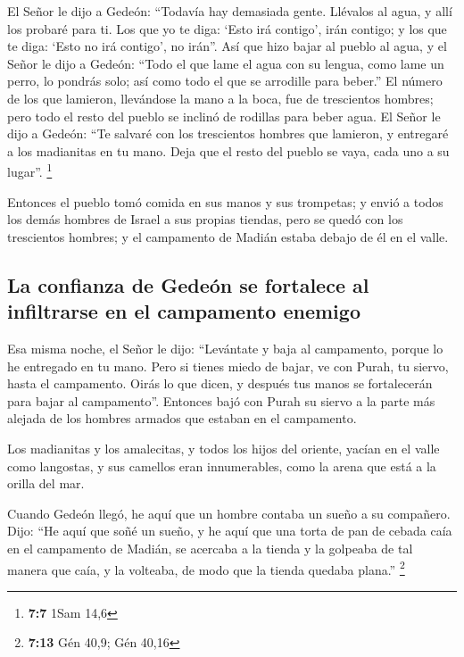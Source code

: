 \begin{paracol}{2}
 El Señor le dijo a Gedeón: ``Todavía hay demasiada gente.
Llévalos al agua, y allí los probaré para ti. Los que yo te diga: `Esto
irá contigo', irán contigo; y los que te diga: `Esto no irá contigo', no
irán''.  Así que hizo bajar al pueblo al agua, y el Señor
le dijo a Gedeón: ``Todo el que lame el agua con su lengua, como lame un
perro, lo pondrás solo; así como todo el que se arrodille para beber.''
 El número de los que lamieron, llevándose la mano a la
boca, fue de trescientos hombres; pero todo el resto del pueblo se
inclinó de rodillas para beber agua.  El Señor le dijo a
Gedeón: ``Te salvaré con los trescientos hombres que lamieron, y
entregaré a los madianitas en tu mano. Deja que el resto del pueblo se
vaya, cada uno a su lugar''. \footnote{\textbf{7:7} 1Sam 14,6}

 Entonces el pueblo tomó comida en sus manos y sus
trompetas; y envió a todos los demás hombres de Israel a sus propias
tiendas, pero se quedó con los trescientos hombres; y el campamento de
Madián estaba debajo de él en el valle.

\hypertarget{la-confianza-de-gedeuxf3n-se-fortalece-al-infiltrarse-en-el-campamento-enemigo}{%
\subsection{La confianza de Gedeón se fortalece al infiltrarse en el
campamento
enemigo}\label{la-confianza-de-gedeuxf3n-se-fortalece-al-infiltrarse-en-el-campamento-enemigo}}

 Esa misma noche, el Señor le dijo: ``Levántate y baja al
campamento, porque lo he entregado en tu mano.  Pero si
tienes miedo de bajar, ve con Purah, tu siervo, hasta el campamento.
 Oirás lo que dicen, y después tus manos se fortalecerán
para bajar al campamento''. Entonces bajó con Purah su siervo a la parte
más alejada de los hombres armados que estaban en el campamento.

 Los madianitas y los amalecitas, y todos los hijos del
oriente, yacían en el valle como langostas, y sus camellos eran
innumerables, como la arena que está a la orilla del mar.

 Cuando Gedeón llegó, he aquí que un hombre contaba un
sueño a su compañero. Dijo: ``He aquí que soñé un sueño, y he aquí que
una torta de pan de cebada caía en el campamento de Madián, se acercaba
a la tienda y la golpeaba de tal manera que caía, y la volteaba, de modo
que la tienda quedaba plana.'' \footnote{\textbf{7:13} Gén 40,9; Gén
  40,16}


\end{paracol}
